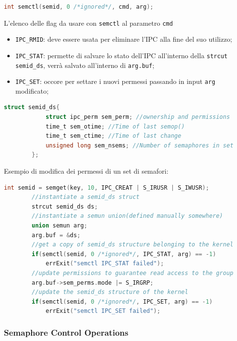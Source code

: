 \documentclass[a4paper, 12pt]{book}
\begin{document}
    \begin{lstlisting}[language=C]
        int semctl(semid, 0 /*ignored*/, cmd, arg);
    \end{lstlisting}
    L'elenco delle flag da usare con \verb|semctl| al parametro 
    \verb|cmd|
    \begin{itemize}
        \item \verb|IPC_RMID|: deve essere usata per eliminare l'IPC 
        alla fine del suo utilizzo;
        \item \verb|IPC_STAT|: permette di salvare lo stato dell'IPC 
        all'interno della \verb|strcut semid_ds|, verrà salvato 
        all'interno di \verb|arg.buf|;
        \item \verb|IPC_SET|: occore per settare i nuovi permessi
        passando in input \verb|arg| modificato;
    \end{itemize}
    \begin{lstlisting}[language=C]
        struct semid_ds{
            struct ipc_perm sem_perm; //ownership and permissions
            time_t sem_otime; //Time of last semop()
            time_t sem_ctime; //Time of last change
            unsigned long sem_nsems; //Number of semaphores in set
        };
    \end{lstlisting}
    Esempio di modifica dei permessi di un set di semafori:
    \begin{lstlisting}[language=C]
        int semid = semget(key, 10, IPC_CREAT | S_IRUSR | S_IWUSR);
        //instantiate a semid_ds struct 
        strcut semid_ds ds;
        //instantiate a semun union(defined manually somewhere)
        union semun arg;
        arg.buf = &ds;
        //get a copy of semid_ds structure belonging to the kernel 
        if(semctl(semid, 0 /*ignored*/, IPC_STAT, arg) == -1)
            errExit("semctl IPC_STAT failed");
        //update permissions to guarantee read access to the group 
        arg.buf->sem_perms.mode |= S_IRGRP;
        //update the semid_ds structure of the kernel 
        if(semctl(semid, 0 /*ignored*/, IPC_SET, arg) == -1)
            errExit("semctl IPC_SET failed");
    \end{lstlisting}

    \subsubsection{Semaphore Control Operations}
\end{document}
